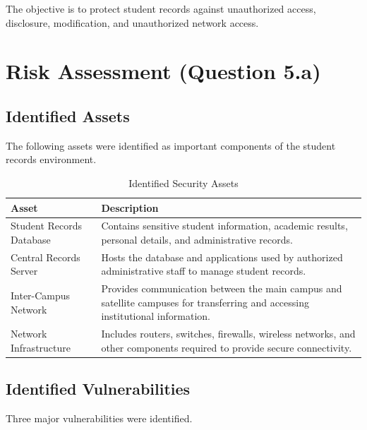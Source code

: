 \documentclass[12pt,a4paper]{article}
\begin{document}
The objective is to protect student records against unauthorized access, disclosure, modification, and unauthorized network access.


\section{Risk Assessment (Question 5.a)}

\subsection{Identified Assets}

The following assets were identified as important components of the student records environment.

\begin{table}[htbp]
\centering
\caption{Identified Security Assets}
\begin{tabular}{p{4cm} p{9cm}}
\toprule
\textbf{Asset} & \textbf{Description} \\
\midrule

Student Records Database &
Contains sensitive student information, academic results, personal details, and administrative records. \\

Central Records Server &
Hosts the database and applications used by authorized administrative staff to manage student records. \\

Inter-Campus Network &
Provides communication between the main campus and satellite campuses for transferring and accessing institutional information. \\

Network Infrastructure &
Includes routers, switches, firewalls, wireless networks, and other components required to provide secure connectivity. \\

\bottomrule
\end{tabular}
\end{table}

\subsection{Identified Vulnerabilities}

Three major vulnerabilities were identified.
\end{document}
